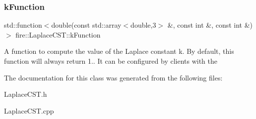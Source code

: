 \subsubsection{\texorpdfstring{k\+Function}{kFunction}}
{\footnotesize\ttfamily std\+::function$<$double(const std\+::array$<$double,3$>$ \&, const int \&, const int \&)$>$ fire\+::\+Laplace\+C\+S\+T\+::k\+Function\hspace{0.3cm}{\ttfamily [protected]}}

A function to compute the value of the Laplace constant k. By default, this function will always return 1.. It can be configured by clients with the 

The documentation for this class was generated from the following files\+:\begin{DoxyCompactItemize}
\item 
Laplace\+C\+S\+T.\+h\item 
Laplace\+C\+S\+T.\+cpp\end{DoxyCompactItemize}
